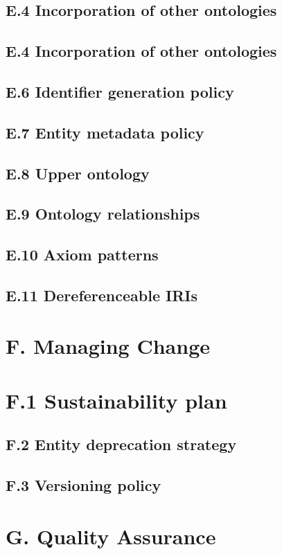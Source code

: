 \documentclass{article}
\begin{document}
\subsection*{E.4 Incorporation of other ontologies}
\subsection*{E.4 Incorporation of other ontologies}
\subsection*{E.6 Identifier generation policy}
\subsection*{E.7 Entity metadata policy}
\subsection*{E.8 Upper ontology}
\subsection*{E.9 Ontology relationships}
\subsection*{E.10 Axiom patterns }
\subsection*{E.11 Dereferenceable IRIs }
\section*{F. Managing Change}
\section*{F.1 Sustainability plan}
\subsection*{F.2 Entity deprecation strategy }
\subsection*{F.3 Versioning policy}
\section*{G. Quality Assurance}
\end{document}
